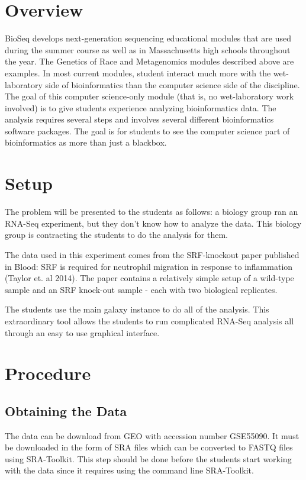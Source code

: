 \documentclass{report}
\begin{document}
\section{Overview}
BioSeq develops next-generation sequencing educational modules that are used during the summer course as well as in  Massachusetts high schools throughout the year. The Genetics of Race and Metagenomics modules described above are examples. In most current modules, student interact much more with the wet-laboratory side of bioinformatics than the computer science side of the discipline. The goal of this computer science-only module (that is, no wet-laboratory work involved) is to give students experience analyzing bioinformatics data. The analysis requires several steps and involves several different bioinformatics software packages. The goal is for students to see the computer science part of bioinformatics as more than just a blackbox.

\section{Setup}
The problem will be presented to the students as follows: a biology group ran an RNA-Seq experiment, but they don't know how to analyze the data. This biology group is contracting the students to do the analysis for them. 

The data used in this experiment comes from the SRF-knockout paper published in Blood: SRF is required for neutrophil migration in response to inflammation (Taylor et. al 2014). The paper contains a relatively simple setup of a wild-type sample and an SRF knock-out sample - each with two biological replicates.

The students use the main galaxy instance to do all of the analysis. This extraordinary tool allows the students to run complicated RNA-Seq analysis all through an easy to use graphical interface.

\section{Procedure}
\subsection{Obtaining the Data}
The data can be download from GEO with accession number GSE55090. It must be downloaded in the form of SRA files which can be converted to FASTQ files using SRA-Toolkit. This step should be done before the students start working with the data since it requires using the command line SRA-Toolkit.
\end{document}
